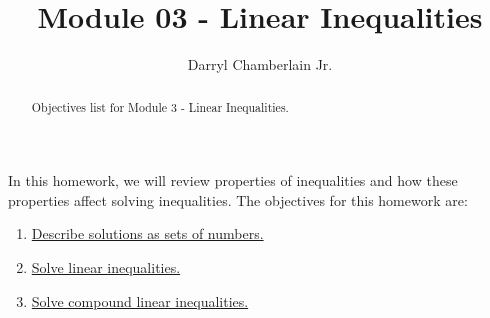\documentclass{ximera}
\author{Darryl Chamberlain Jr.}
\title{Module 03 - Linear Inequalities}
\begin{document}
\begin{abstract}
Objectives list for Module 3 - Linear Inequalities.
\end{abstract}
\maketitle

In this homework, we will review properties of inequalities and how these properties affect solving inequalities. The objectives for this homework are: 
\begin{enumerate}
	\item \href{https://cnx.org/contents/mwjClAV_@8.1:uIjtHMfW@9/Linear-Inequalities-and-Absolute-Value-Inequalities}{Describe solutions as sets of numbers.}
	\item \href{https://cnx.org/contents/mwjClAV_@8.1:uIjtHMfW@9/Linear-Inequalities-and-Absolute-Value-Inequalities}{Solve linear inequalities.}
    \item \href{https://cnx.org/contents/mwjClAV_@8.1:uIjtHMfW@9/Linear-Inequalities-and-Absolute-Value-Inequalities}{Solve compound linear inequalities.}
\end{enumerate}
\end{document}
